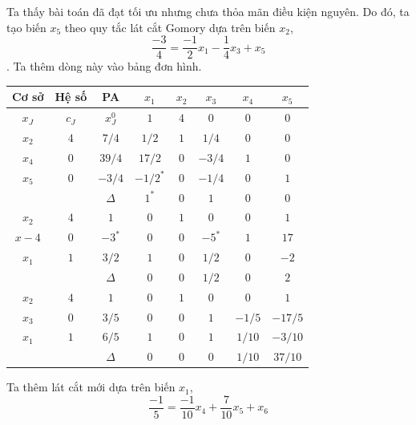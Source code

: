 \documentclass[12pt,a4paper]{report}
\begin{document}
    Ta thấy bài toán đã đạt tối ưu nhưng chưa thỏa mãn điều kiện nguyên. Do đó, ta tạo biến $x_5$ theo quy tắc lát cắt Gomory dựa trên biến $x_2$, $$\dfrac{-3}{4}= \dfrac{-1}{2}x_1 -\dfrac{1}{4}x_3 +x_5$$. Ta thêm dòng này vào bảng đơn hình.\\
    \begin{center}
        \begin{tabular}{|c|c|c|c|c|c|c|c|}
        \hline
         Cơ sở & Hệ số & PA& $x_1$ &$x_2$ &$ x_3$ &$x_4$ &$x_5$\\
        \hline
        $x_J$ &$c_J$ &$x_J^0$ &$1$ &$4$ &$0$ &$0$ &$0$\\
        \hline
        $x_2$ &$4$ &$7/4$ &$1/2$ &$1$ &$1/4$ &$0$ &$0$\\
        $x_4$ &$0$ &$39/4$ &$17/2$ &$0$ &$-3/4$ &$1$ &$0$\\
        $x_5$ &$0$ &$-3/4$ &$-1/2^*$ &$0$ &$-1/4$ &$0$ &$1$\\
        \hline
        && $\Delta$ &$1^* $ &$0$ &$1$ &$0$ &$0$\\
        \hline
        $x_2$ &$ 4$ &$1$ &$0$ &$1$ &$0$ &$0$ &$1$\\
        $x-4$ &$0$ &$-3^*$ &$0$ &$0$ &$-5^*$ &$1$ &$17$\\
        $x_1$ & $1$ &$3/2$ &$1$ &$0$ &$1/2$&$0$ &$-2$\\
        \hline
        && $\Delta$ &$0$ &$0$ &$1/2$ &$0$ &$2$\\
        \hline
        $x_2$ &$4$ &$1$ &$0$ &$1$ &$0$ &$0$ &$1$\\
        $x_3$ &$0$ &$3/5$ &$0$ &$0$ &$1$ &$-1/5$ &$-17/5$\\
        $x_1$ &$1$ &$6/5$ &$1$ &$0$ &$1$ &$1/10$&$-3/10$\\
        \hline
        && $\Delta$ &$0$ &$0$ &$0$ &$1/10$ &$37/10$\\
        \hline
        
        \end{tabular}
    \end{center}
    Ta thêm lát cắt mới dựa trên biến $x_1$, 
     $$\dfrac{-1}{5}= \dfrac{-1}{10}x_4 +\dfrac{7}{10}x_5+x_6$$
\end{document}
